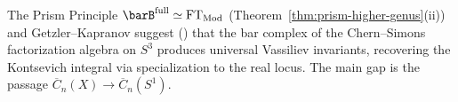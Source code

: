 \begin{remark}
\label{rem:vassiliev}
The Prism Principle $\barB^{\mathrm{full}} \simeq \mathrm{FT}_{\mathrm{Mod}}$ (Theorem~\ref{thm:prism-higher-genus}(ii)) and Getzler--Kapranov \cite{GeK98} suggest (\ClaimStatusConjectured) that the bar complex of the Chern--Simons factorization algebra on $S^3$ produces universal Vassiliev invariants, recovering the Kontsevich integral via specialization to the real locus.  The main gap is the passage $\overline{C}_n(X) \to \overline{C}_n(S^1)$.
\end{remark}

